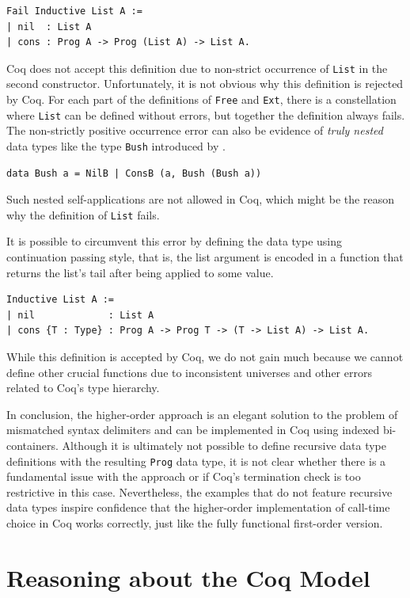 \documentclass[a4paper, 11pt, fleqn, twoside, abstract=on]{scrreprt}
\newcommand{\hinl}[1]{\texttt{#1}}
\newcommand{\cinl}[1]{\texttt{#1}}
\begin{document}
\begin{verbatim}
Fail Inductive List A :=
| nil  : List A
| cons : Prog A -> Prog (List A) -> List A.
\end{verbatim}

Coq does not accept this definition due to non-strict occurrence of \cinl{List} in the second constructor.
Unfortunately, it is not obvious why this definition is rejected by Coq.
For each part of the definitions of \cinl{Free} and \cinl{Ext}, there is a constellation where \cinl{List} can be defined without errors, but together the definition always fails.
The non-strictly positive occurrence error can also be evidence of \textit{truly nested} data types like the type \hinl{Bush} introduced by \citet{bird1998nested}.

\begin{verbatim}
data Bush a = NilB | ConsB (a, Bush (Bush a))
\end{verbatim}

Such nested self-applications are not allowed in Coq, which might be the reason why the definition of \cinl{List} fails.

It is possible to circumvent this error by defining the data type using continuation passing style, that is, the list argument is encoded in a function that returns the list's tail after being applied to some value.

\begin{verbatim}
Inductive List A :=
| nil             : List A
| cons {T : Type} : Prog A -> Prog T -> (T -> List A) -> List A.
\end{verbatim}
\noindent
While this definition is accepted by Coq, we do not gain much because we cannot define other crucial functions due to inconsistent universes and other errors related to Coq's type hierarchy.

In conclusion, the higher-order approach is an elegant solution to the problem of mismatched syntax delimiters and can be implemented in Coq using indexed bi-containers.
Although it is ultimately not possible to define recursive data type definitions with the resulting \cinl{Prog} data type, it is not clear whether there is a fundamental issue with the approach or if Coq's termination check is too restrictive in this case.
Nevertheless, the examples that do not feature recursive data types inspire confidence that the higher-order implementation of call-time choice in Coq works correctly, just like the fully functional first-order version.

\chapter{Reasoning about the Coq Model}
\label{ch:progsInCoq}
\end{document}
